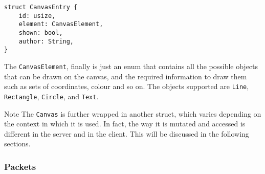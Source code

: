 \documentclass{article}
\newcommand{\code}[1]{\texttt{#1}}
\begin{document}
\begin{subbox}{}
    \begin{lstlisting}
struct CanvasEntry {
    id: usize,
    element: CanvasElement,
    shown: bool,
    author: String,
}
\end{lstlisting}
\end{subbox}

The \code{CanvasElement}, finally is just an enum that contains all the possible objects that can be drawn on the canvas, and the required information to draw them such as sets of coordinates, colour and so on. The objects supported are \code{Line}, \code{Rectangle}, \code{Circle}, and \code{Text}.

\vspace{1em}

\begin{mainbox}{Note}
    The \code{Canvas} is further wrapped in another struct, which varies depending on the context in which it is used. In fact, the way it is mutated and accessed is different in the server and in the client. This will be discussed in the following sections.
\end{mainbox}

\newpage

\subsubsection{Packets}
\end{document}
